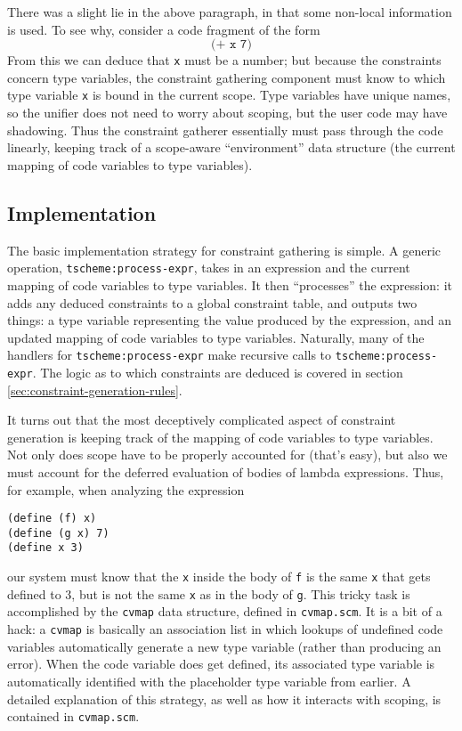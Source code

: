 \documentclass[a4paper]{article}
\newcommand{\T}[1]{\texttt{#1}}
\begin{document}
There was a slight lie in the above paragraph, in that some non-local
information is used.  To see why, consider a code fragment of the form
\[ \T{(+ x 7)} \]
From this we can deduce that \T{x} must be a number; but because the constraints
concern type variables, the constraint gathering component must know to which
type variable \T{x} is bound in the current scope.  Type variables have unique
names, so the unifier does not need to worry about scoping, but the user code
may have shadowing.  Thus the constraint gatherer essentially must pass through
the code linearly, keeping track of a scope-aware ``environment'' data structure
(the current mapping of code variables to type variables).

\subsection{Implementation}
The basic implementation strategy for constraint gathering is simple.  A generic
operation, \T{tscheme:process-expr}, takes in an expression and the current
mapping of code variables to type variables.  It then ``processes'' the
expression: it adds any deduced constraints to a global constraint table, and
outputs two things: a type variable representing the value produced by the
expression, and an updated mapping of code variables to type variables.
Naturally, many of the handlers for \T{tscheme:process-expr} make recursive
calls to \T{tscheme:process-expr}.  The logic as to which constraints are
deduced is covered in section \ref{sec:constraint-generation-rules}.

It turns out that the most deceptively complicated aspect of constraint
generation is keeping track of the mapping of code variables to type variables.
Not only does scope have to be properly accounted for (that's easy), but also we
must account for the deferred evaluation of bodies of lambda expressions.  Thus,
for example, when analyzing the expression
\begin{verbatim}
(define (f) x)
(define (g x) 7)
(define x 3)
\end{verbatim}
our system must know that the \T{x} inside the body of \T{f} is the same \T{x}
that gets defined to 3, but is not the same \T{x} as in the body of \T{g}.  This
tricky task is accomplished by the \T{cvmap} data structure, defined in
\T{cvmap.scm}.  It is a bit of a hack: a \T{cvmap} is basically an association
list in which lookups of undefined code variables automatically generate a new
type variable (rather than producing an error).  When the code variable does get
defined, its associated type variable is automatically identified with the
placeholder type variable from earlier.  A detailed explanation of this
strategy, as well as how it interacts with scoping, is contained in
\T{cvmap.scm}.
\end{document}
